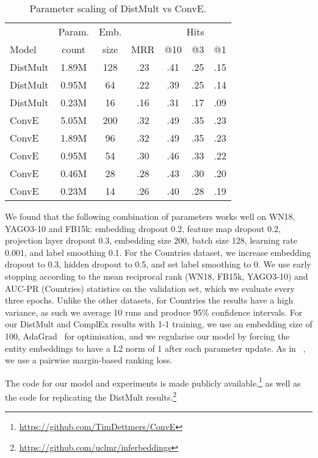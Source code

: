 \documentclass[letterpaper]{article}
\newcommand{\citet}[1]{\citeauthor{#1}~\shortcite{#1}}
\newcommand{\citep}{\cite}
\begin{document}
\begin{table}[t]
	\caption{Parameter scaling of DistMult vs ConvE.}
	\label{parameters}
	\begin{center}
	\begin{tabular}{lcccccc}
	    \toprule
		 & Param. & Emb. & & \multicolumn{3}{c}{{ Hits}}   \\
		Model & count & size  &  MRR & @10 & @3 & @1 \\
		\midrule
		DistMult & 1.89M & 128 &  .23 & .41 & .25 & .15  \\
		DistMult & 0.95M & 64 &  .22 & .39 & .25 & .14  \\
		DistMult & 0.23M & 16 &  .16 & .31 & .17 & .09  \\
		\midrule
		ConvE & 5.05M & 200 &  .32 & .49 & .35 & .23  \\
		ConvE & 1.89M & 96 &  .32 & .49 & .35 & .23  \\
		ConvE & 0.95M & 54 &  .30 & .46 & .33 & .22  \\
		ConvE & 0.46M & 28 &  .28 & .43 & .30 & .20  \\
		ConvE & 0.23M & 14 &  .26 & .40 & .28 & .19  \\
	\bottomrule
\end{tabular}
\end{center}
\end{table}


We found that the following combination of parameters works well on WN18, YAGO3-10 and FB15k: embedding dropout 0.2, feature map dropout 0.2, projection layer dropout 0.3, embedding size 200, batch size 128, learning rate 0.001, and label smoothing 0.1.
For the Countries dataset, we increase embedding dropout to 0.3, hidden dropout to 0.5, and set label smoothing to 0.
We use early stopping according to the mean reciprocal rank (WN18, FB15k, YAGO3-10) and AUC-PR (Countries) statistics on the validation set, which we evaluate every three epochs.
Unlike the other datasets, for Countries the results have a high variance, as such we average 10 runs and produce 95\% confidence intervals. 
For our DistMult and ComplEx results with 1-1 training, we use an embedding size of 100, AdaGrad~\citep{DBLP:journals/jmlr/DuchiHS11} for optimisation, and we regularise our model by forcing the entity embeddings to have a L2 norm of 1 after each parameter update.
As in \citet{DBLP:conf/nips/BordesUGWY13}, we use a pairwise margin-based ranking loss.


The code for our model and experiments is made publicly available,\footnote{\url{https://github.com/TimDettmers/ConvE}} as well as the code for replicating the DistMult results.\footnote{\url{https://github.com/uclmr/inferbeddings}}
\end{document}
